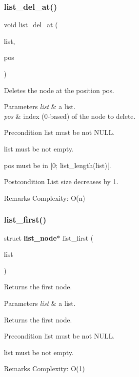 \subsubsection{list\+\_\+del\+\_\+at()}
{\footnotesize\ttfamily void list\+\_\+del\+\_\+at (\begin{DoxyParamCaption}\item[{struct \textbf{ list} $\ast$}]{list,  }\item[{size\+\_\+t}]{pos }\end{DoxyParamCaption})\hspace{0.3cm}{\ttfamily [inline]}}

Deletes the node at the position {\ttfamily pos}.


\begin{DoxyParams}{Parameters}
{\em list} & a list. \\
\hline
{\em pos} & index (0-\/based) of the node to delete.\\
\hline
\end{DoxyParams}
\begin{DoxyPrecond}{Precondition}
{\ttfamily list} must be not N\+U\+LL. 

{\ttfamily list} must be not empty. 

{\ttfamily pos} must be in [0; list\+\_\+length(list)[.
\end{DoxyPrecond}
\begin{DoxyPostcond}{Postcondition}
List size decreases by 1.
\end{DoxyPostcond}
\begin{DoxyRemark}{Remarks}
Complexity\+: O(n) 
\end{DoxyRemark}
\mbox{\label{list_8c_ab31246f096207d08b4756bd2c209fa2b}} 
\subsubsection{list\+\_\+first()}
{\footnotesize\ttfamily struct \textbf{ list\+\_\+node}$\ast$ list\+\_\+first (\begin{DoxyParamCaption}\item[{const struct \textbf{ list} $\ast$}]{list }\end{DoxyParamCaption})}

Returns the first node.


\begin{DoxyParams}{Parameters}
{\em list} & a list. \\
\hline
\end{DoxyParams}
\begin{DoxyReturn}{Returns}
the first node.
\end{DoxyReturn}
\begin{DoxyPrecond}{Precondition}
{\ttfamily list} must be not N\+U\+LL. 

{\ttfamily list} must be not empty.
\end{DoxyPrecond}
\begin{DoxyRemark}{Remarks}
Complexity\+: O(1) 
\end{DoxyRemark}
\mbox{\label{list_8c_a8aa862d10f52f7b0348fce990c7c12db}} 
